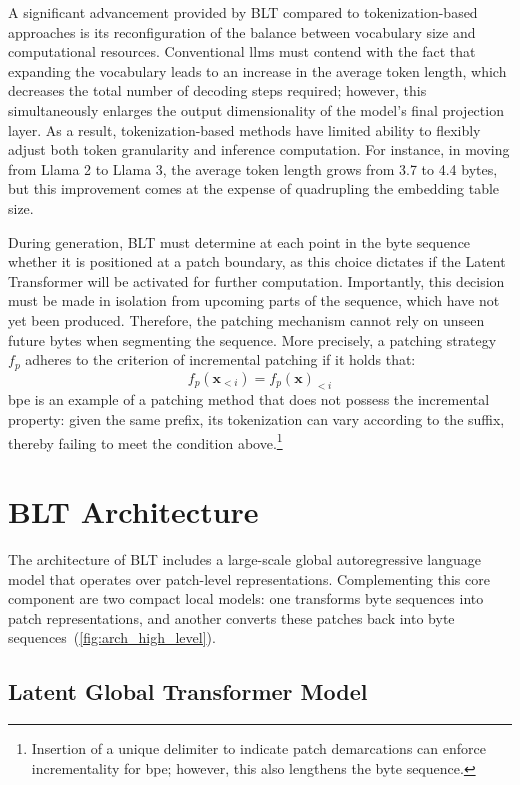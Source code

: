 A significant advancement provided by {\textsc BLT} compared to tokenization-based approaches is its reconfiguration of the balance between vocabulary size and computational resources. Conventional llms must contend with the fact that expanding the vocabulary leads to an increase in the average token length, which decreases the total number of decoding steps required; however, this simultaneously enlarges the output dimensionality of the model's final projection layer. As a result, tokenization-based methods have limited ability to flexibly adjust both token granularity and inference computation. For instance, in moving from Llama 2 to Llama 3, the average token length grows from 3.7 to 4.4 bytes, but this improvement comes at the expense of quadrupling the embedding table size.

During generation, {\textsc BLT} must determine at each point in the byte sequence whether it is positioned at a patch boundary, as this choice dictates if the Latent Transformer will be activated for further computation. Importantly, this decision must be made in isolation from upcoming parts of the sequence, which have not yet been produced. Therefore, the patching mechanism cannot rely on unseen future bytes when segmenting the sequence. More precisely, a patching strategy $f_p$ adheres to the criterion of incremental patching if it holds that:
$$f_p(\pmb{x}_{<i}) = f_p(\pmb{x})_{<i}$$
bpe is an example of a patching method that does not possess the incremental property: given the same prefix, its tokenization can vary according to the suffix, thereby failing to meet the condition above.\footnote{Insertion of a unique delimiter to indicate patch demarcations can enforce incrementality for bpe; however, this also lengthens the byte sequence.}

\section{{\textsc BLT} Architecture}
\label{section:architecture}
The architecture of {\textsc BLT} includes a large-scale global autoregressive language model that operates over patch-level representations. Complementing this core component are two compact local models: one transforms byte sequences into patch representations, and another converts these patches back into byte sequences~(\autoref{fig:arch_high_level}).

\subsection{Latent Global Transformer Model}


